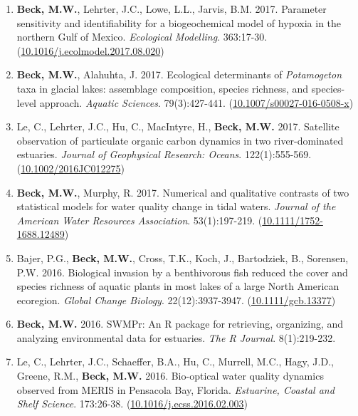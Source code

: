 \documentclass[letterpaper,12pt]{article}
\begin{document}
\begin{enumerate}
\item \textbf{Beck, M.W.}, Lehrter, J.C., Lowe, L.L., Jarvis, B.M. 2017. Parameter sensitivity and identifiability for a biogeochemical model of hypoxia in the northern Gulf of Mexico. \textit{Ecological Modelling}. 363:17-30. ({\footnotesize\href{http://dx.doi.org/10.1016/j.ecolmodel.2017.08.020}{10.1016/j.ecolmodel.2017.08.020}})

\item \textbf{Beck, M.W.}, Alahuhta, J. 2017. Ecological determinants of \textit{Potamogeton} taxa in glacial lakes: assemblage composition, species richness, and species-level approach. \textit{Aquatic Sciences}. 79(3):427-441. ({\footnotesize\href{https://doi.org/10.1007/s00027-016-0508-x}{10.1007/s00027-016-0508-x}})

\item Le, C., Lehrter, J.C., Hu, C., MacIntyre, H., \textbf{Beck, M.W.} 2017. Satellite observation of particulate organic carbon dynamics in two river-dominated estuaries. \textit{Journal of Geophysical Research: Oceans}. 122(1):555-569. ({\footnotesize\href{http://dx.doi.org/10.1002/2016JC012275}{10.1002/2016JC012275}})

\item \textbf{Beck, M.W.}, Murphy, R. 2017. Numerical and qualitative contrasts of two statistical models for water quality change in tidal waters. \textit{Journal of the American Water Resources Association}. 53(1):197-219. ({\footnotesize\href{http://dx.doi.org/10.1111/1752-1688.12489}{10.1111/1752-1688.12489}})

\item Bajer, P.G., \textbf{Beck, M.W.}, Cross, T.K., Koch, J., Bartodziek, B., Sorensen, P.W. 2016. Biological invasion by a benthivorous fish reduced the cover and species richness of aquatic plants in most lakes of a large North American ecoregion. \textit{Global Change Biology}. 22(12):3937-3947. ({\footnotesize\href{http://dx.doi.org/10.1111/gcb.13377}{10.1111/gcb.13377}})

\item \textbf{Beck, M.W.} 2016. SWMPr: An R package for retrieving, organizing, and analyzing environmental data for estuaries. \textit{The R Journal}. 8(1):219-232.

\item Le, C., Lehrter, J.C., Schaeffer, B.A., Hu, C., Murrell, M.C., Hagy, J.D., Greene, R.M., \textbf{Beck, M.W.} 2016. Bio-optical water quality dynamics observed from MERIS in Pensacola Bay, Florida. \textit{Estuarine, Coastal and Shelf Science}. 173:26-38. ({\footnotesize\href{https://doi.org/10.1016/j.ecss.2016.02.003}{10.1016/j.ecss.2016.02.003}})


\end{enumerate}
\end{document}
